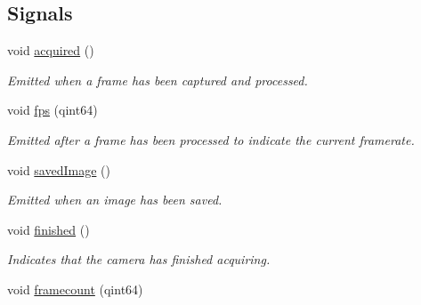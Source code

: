 \subsection*{Signals}
\begin{DoxyCompactItemize}
\item 
\hypertarget{class_abstract_stereo_camera_a84dad2b829994b2da0cc4c2c9f7000c4}{}void \hyperlink{class_abstract_stereo_camera_a84dad2b829994b2da0cc4c2c9f7000c4}{acquired} ()\label{class_abstract_stereo_camera_a84dad2b829994b2da0cc4c2c9f7000c4}

\begin{DoxyCompactList}\small\item\em Emitted when a frame has been captured and processed. \end{DoxyCompactList}\item 
\hypertarget{class_abstract_stereo_camera_a2c94f041f379bea5a5d2b4e2e5ba0217}{}void \hyperlink{class_abstract_stereo_camera_a2c94f041f379bea5a5d2b4e2e5ba0217}{fps} (qint64)\label{class_abstract_stereo_camera_a2c94f041f379bea5a5d2b4e2e5ba0217}

\begin{DoxyCompactList}\small\item\em Emitted after a frame has been processed to indicate the current framerate. \end{DoxyCompactList}\item 
\hypertarget{class_abstract_stereo_camera_a6eb388b6b235a928d5792d01db3e0654}{}void \hyperlink{class_abstract_stereo_camera_a6eb388b6b235a928d5792d01db3e0654}{saved\+Image} ()\label{class_abstract_stereo_camera_a6eb388b6b235a928d5792d01db3e0654}

\begin{DoxyCompactList}\small\item\em Emitted when an image has been saved. \end{DoxyCompactList}\item 
\hypertarget{class_abstract_stereo_camera_ae7cf0a8b94f4ee9bba33d8f6fc1d2be0}{}void \hyperlink{class_abstract_stereo_camera_ae7cf0a8b94f4ee9bba33d8f6fc1d2be0}{finished} ()\label{class_abstract_stereo_camera_ae7cf0a8b94f4ee9bba33d8f6fc1d2be0}

\begin{DoxyCompactList}\small\item\em Indicates that the camera has finished acquiring. \end{DoxyCompactList}\item 
\hypertarget{class_abstract_stereo_camera_a23d9368ea4cf1fcac6da6c2b153694d3}{}void \hyperlink{class_abstract_stereo_camera_a23d9368ea4cf1fcac6da6c2b153694d3}{framecount} (qint64)\label{class_abstract_stereo_camera_a23d9368ea4cf1fcac6da6c2b153694d3}


\end{DoxyCompactItemize}
